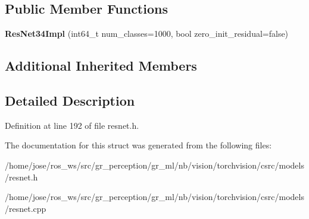 \subsection*{Public Member Functions}
\begin{DoxyCompactItemize}
\item 
\mbox{\label{structvision_1_1models_1_1ResNet34Impl_abf515af124f70ce8f5a3f98489a119bb}} 
{\bfseries Res\+Net34\+Impl} (int64\+\_\+t num\+\_\+classes=1000, bool zero\+\_\+init\+\_\+residual=false)
\end{DoxyCompactItemize}
\subsection*{Additional Inherited Members}


\subsection{Detailed Description}


Definition at line 192 of file resnet.\+h.



The documentation for this struct was generated from the following files\+:\begin{DoxyCompactItemize}
\item 
/home/jose/ros\+\_\+ws/src/gr\+\_\+perception/gr\+\_\+ml/nb/vision/torchvision/csrc/models/resnet.\+h\item 
/home/jose/ros\+\_\+ws/src/gr\+\_\+perception/gr\+\_\+ml/nb/vision/torchvision/csrc/models/resnet.\+cpp\end{DoxyCompactItemize}
